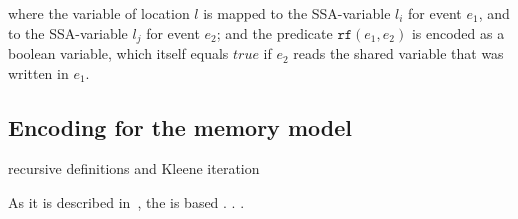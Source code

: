 where the variable of location $l$ is mapped to the SSA-variable $l_i$ for event $e_1$, and to the SSA-variable $l_j$ for event $e_2$; and the predicate $\mathtt{rf}(e_1, e_2)$ is encoded as a boolean variable, which itself equals $true$ if $e_2$ reads the shared variable that was written in $e_1$.


\subsection{Encoding for the memory model} %
\label{ch:port:enc:wmm}


recursive definitions and Kleene iteration

As it is described in~\cite{Porthos17}, the is based . . .
